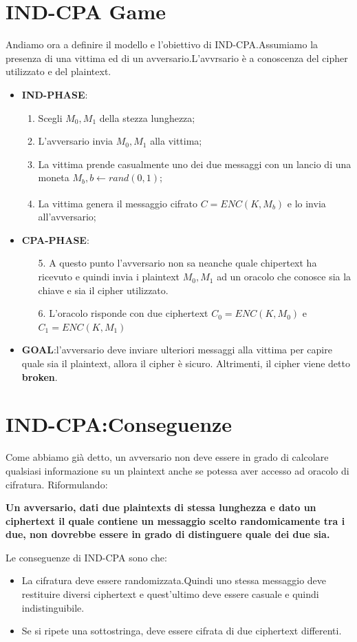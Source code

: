 \documentclass{book}
\theoremstyle{remark}
\begin{document}
\chapter{IND-CPA Game}
Andiamo ora a definire il modello e l'obiettivo di IND-CPA.Assumiamo la presenza di una vittima ed di un avversario.L'avvrsario è a conoscenza del cipher utilizzato e del plaintext.
\begin{itemize}
	\item \textbf{IND-PHASE}:
	      \begin{enumerate}
		      \item Scegli \(M_0,M_1\) della stezza lunghezza;\@
		      \item L'avversario invia \(M_0,M_1\) alla vittima;\@
		      \item La vittima prende casualmente uno dei due messaggi con un lancio di una moneta \(M_b,b\xleftarrow[]{} rand(0,1)\);\@
		      \item La vittima genera il messaggio cifrato \(C = ENC(K,M_b)\) e lo invia all'avversario;\@
	      \end{enumerate}
	\item \textbf{CPA-PHASE}:
	      \begin{enumerate}
		      \item[5.] A questo punto l'avversario non sa neanche quale chipertext ha ricevuto e quindi invia i plaintext \(M_0,M_1\) ad un oracolo che conosce sia la chiave e sia il cipher utilizzato.
		      \item[6.] L'oracolo risponde con due ciphertext \(C_0 = ENC(K,M_0)\) e \(C_1 = ENC(K,M_1)\)
	      \end{enumerate}
	\item \textbf{GOAL}:\@Se l'avversario deve inviare ulteriori messaggi alla vittima per capire quale sia il plaintext, allora il cipher è sicuro. Altrimenti, il cipher viene detto \textbf{broken}.
\end{itemize}
\chapter{IND-CPA:Conseguenze}
Come abbiamo già detto, un avversario non deve essere in grado di calcolare qualsiasi informazione su un plaintext anche se potessa aver accesso ad oracolo di cifratura. Riformulando:
\begin{center}
	\textbf{Un avversario, dati due plaintexts di stessa lunghezza e dato un ciphertext il quale contiene un messaggio scelto randomicamente tra i due, non dovrebbe essere in grado di distinguere quale dei due sia.}
\end{center}
Le conseguenze di IND-CPA sono che:
\begin{itemize}
	\item La cifratura deve essere randomizzata\@.\newline Quindi uno stessa messaggio deve restituire diversi ciphertext e quest'ultimo deve essere casuale e quindi indistinguibile.
	\item Se si ripete una sottostringa, deve essere cifrata di due ciphertext differenti\@.
\end{itemize}
\end{document}
